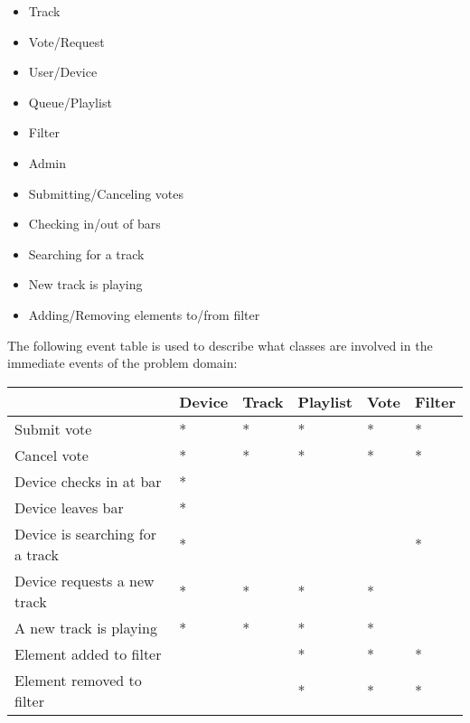 \begin{itemize}
\item Track
\item Vote/Request
\item User/Device
\item Queue/Playlist
\item Filter
\item Admin
\end{itemize}

\begin{itemize}
\item Submitting/Canceling votes
\item Checking in/out of bars
\item Searching for a track
\item New track is playing
\item Adding/Removing elements to/from filter
\end{itemize}

The following event table is used to describe what classes are involved in the immediate events of the problem domain:

\begin{center}
    \begin{tabular}{|l|l|l|l|l|l|}
    \hline
     & Device & Track & Playlist & Vote & Filter \\ \hline
    Submit vote & * & * & * & * & * \\ \hline
    Cancel vote & * & * & * & * & * \\ \hline
    Device checks in at bar & * &   &   &   &   \\ \hline
    Device leaves bar & * &   &   &   &   \\ \hline
    Device is searching for a track & * &   &   &  & * \\ \hline
    Device requests a new track & * & * & * & * &   \\ \hline
    A new track is playing & * & * & * & * &   \\ \hline
    Element added to filter &   &   & * & * & * \\ \hline
    Element removed to filter &   &   & * & * & * \\ \hline
    \end{tabular}
\end{center}
